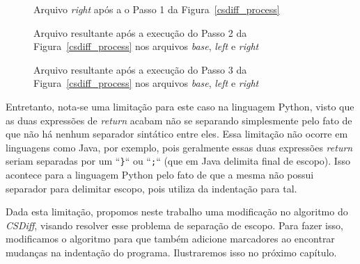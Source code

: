 \begin{figure}[ht]
	\begin{center}
		
        \caption{Arquivo \emph{right} após a o Passo 1 da
        Figura~\ref{csdiff_process}}\label{right_marcadores}
	\end{center}
\end{figure}

\begin{figure}[ht]
	\begin{center}
		
        \caption{Arquivo resultante após a execução do Passo 2 da
        Figura~\ref{csdiff_process} nos arquivos \emph{base}, \emph{left} e
    \emph{right}}\label{diff3_marcadores}
	\end{center}
\end{figure}

\begin{figure}[ht]
	\begin{center}
        
        \caption{Arquivo resultante após a execução do Passo 3 da
        Figura~\ref{csdiff_process} nos arquivos \emph{base}, \emph{left} e
    \emph{right}}\label{csdiff_before}
	\end{center}
\end{figure}

Entretanto, nota-se uma limitação para este caso na linguagem Python, visto que
as duas expressões de \emph{return} acabam não se separando simplesmente pelo
fato de que não há nenhum separador sintático entre eles. Essa limitação não
ocorre em linguagens como Java, por exemplo, pois geralmente essas duas
expressões \emph{return} seriam separadas por um ``\verb|}|`` ou ``\verb|;|``
(que em Java delimita final de escopo). Isso acontece para a linguagem Python
pelo fato de que a mesma não possui separador para delimitar escopo, pois
utiliza da indentação para tal.

Dada esta limitação, propomos neste trabalho uma modificação no algoritmo do
\emph{CSDiff}, visando resolver esse problema de separação de escopo. Para
fazer isso, modificamos o algoritmo para que também adicione marcadores ao
encontrar mudanças na indentação do programa. Ilustraremos isso no próximo
capítulo.



